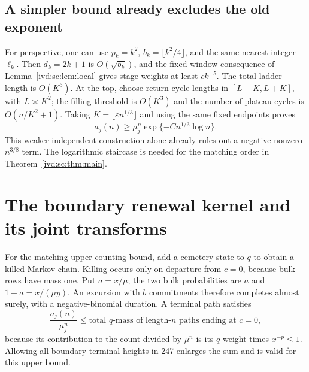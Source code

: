 \documentclass[11pt,letterpaper]{article}
\theoremstyle{remark}\newtheorem{remark}[theorem]{Remark}
\numberwithin{equation}{section}
\begin{document}
\subsection{A simpler bound already excludes the old exponent}\label{ivd:sc:sub:simpler}
For perspective, one can use $p_k=k^2$, $b_k=\lfloor k^2/4\rfloor$,
and the same nearest-integer $\ell_k$. Then $d_k=2k+1$ is
$O(\sqrt{b_k})$, and the fixed-window consequence of
Lemma~\ref{ivd:sc:lem:local} gives stage weights at least $c k^{-5}$.
The total ladder length is $O(K^3)$. At the top, choose return-cycle
lengths in $[L-K,L+K]$, with $L\asymp K^2$; the filling threshold
is $O(K^3)$ and the number of plateau cycles is $O(n/K^2+1)$.
Taking $K=\lfloor\varepsilon n^{1/3}\rfloor$ and using the same fixed
endpoints proves
\[
 a_j(n)\ge\mu_j^n\exp\{-C n^{1/3}\log n\}.
\]
This weaker independent construction alone already rules out a negative
nonzero $n^{3/8}$ term. The logarithmic staircase is needed for the
matching order in Theorem~\ref{ivd:sc:thm:main}.

\section{The boundary renewal kernel and its joint transforms}\label{ivd:sc:sec:kernel}
For the matching upper counting bound, add a cemetery state to $q$ to
obtain a killed Markov chain. Killing occurs only on departure from
$c=0$, because bulk rows have mass one. Put $a=x/\mu$; the two bulk
probabilities are $a$ and $1-a=x/(\mu y)$. An excursion with $b$
commitments therefore completes almost surely, with a negative-binomial
duration. A terminal path satisfies
\begin{equation}\label{ivd:sc:eq:relaxterminal}
 \frac{a_j(n)}{\mu_j^n}\le
 \text{total $q$-mass of length-$n$ paths ending at $c=0$},
\end{equation}
because its contribution to the count divided by $\mu^n$ is its
$q$-weight times $x^{-p}\le1$. Allowing all boundary terminal heights
in 247 enlarges the sum and is valid for this upper bound.
\end{document}
